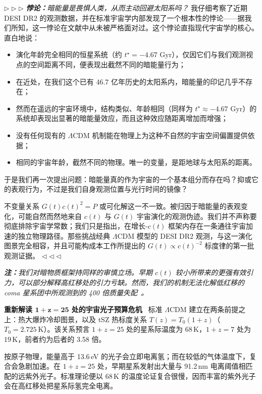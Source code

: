 \documentclass[12pt,leqno]{article}
\begin{document}
	
	\bigskip
	\noindent
	$\triangleright \triangleright \triangleright$\enspace
	\textit{\textbf{悖论：}暗能量是畏惧人类，从而主动回避太阳系吗？} 我仔细考察了近期 DESI DR2 的观测数据，并在标准宇宙学内部发现了一个根本性的悖论——据我们所知，这一悖论在文献中从未被严格面对过。这个悖论直指现代宇宙学的核心。直白地说：	
	\begin{itemize}
		\item 演化年龄完全相同的恒星系统（约 $t^\star = -4.67$ Gyr），仅因它们与我们观测视点的空间距离不同，便表现出截然不同的暗能量行为；		
		\item 在近处，在我们这个已有 46.7 亿年历史的太阳系内，暗能量的印记几乎不存在；
		\item 然而在遥远的宇宙环境中，结构类似、年龄相同（同样为 $t^\star \approx -4.67$ Gyr）的系统却表现出显著的暗能量效应，而且这种效应随距离增加而增强；
		\item 没有任何现有的 $\Lambda$CDM 机制能在物理上为这种不自然的宇宙空间偏置提供依据； 
		\item 相同的宇宙年龄，截然不同的物理。唯一的变量，是距地球与太阳系的距离。
	\end{itemize}
	
	于是我们再一次提出问题：暗能量真的作为宇宙的一个基本组分而存在吗？抑或它的表观行为，不过是我们自身观测位置与光行时间的镜像？
	
	\medskip
	不变量关系 $G(t)c(t)^2=P$ 或可化解这一不一致。被归因于暗能量的表观变化，可能自然而然地来自 \(c(t)\) 与 \(G(t)\) 宇宙演化的观测伪迹。我们并不声称要彻底排除宇宙学常数；我们只是指出，在增长-$c(t)$ 框架内存在一条通往宇宙加速的独立物理路径。那些挑战经典 $\Lambda$CDM 模型的 DESI DR2 观测，与这一演化图景完全相容，并且可能构成本工作所提出的 $G(t) \propto c(t)^{-2}$ 标度律的第一批观测证据。
	\enspace$\triangleleft \triangleleft \triangleleft$
	

	\medskip
	\textit{\textbf{注：}我们对暗物质框架持同样的审慎立场。早期 $c(t)$ 较小所带来的更强有效引力，可以部分解释高红移处的引力亏缺。然而，我们的机制无法化解低红移的 coma 星系团中所观测到的 400 倍质量失配~\cite{Zwicky:1933}。}


	\medskip
	\bigskip
	\textbf{重新解读 $\boldsymbol{1+z=25}$ 处的宇宙光子预算危机}\,\,\,
	标准 $\Lambda$CDM 建立在两条前提之上：热大爆炸冷却图景，以及 tSZ 热标度关系 $T(z)=T_0(1+z)$（$T_0=2.725\ \mathrm{K}$）。该关系预言 $1+z=25$ 处的星系际温度为 $68\,\mathrm{K}$，$1+z=7$ 处为 $19\,\mathrm{K}$，前者约为后者的 3.58 倍。
	
	\medskip
	按原子物理，能量高于 13.6\,eV 的光子会立即电离氢；而在较低的气体温度下，复合会急剧加速。在 $1+z=25$ 处，早期星系发射出大量与 91.2\,nm 电离阈值相匹配的远紫外光子。标准理论便以 $68\,\mathrm{K}$ 的温度论证复合很慢，因而丰富的紫外光子会在高红移处把星系际氢完全电离。
	
\end{document}
